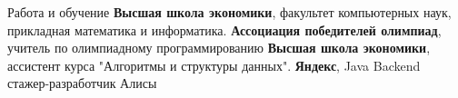 \begin{rubric}{Работа и обучение}
\entry*[\textbf{2019 -- 2023}]
	\textbf{Высшая школа экономики}, факультет компьютерных наук, прикладная математика и информатика.
\entry*[\textbf{2019 -- 2020}]
	\textbf{Ассоциация победителей олимпиад}, учитель по олимпиадному программированию
\entry*[\textbf{2020 -- 2021}]
    \textbf{Высшая школа экономики}, ассистент курса "Алгоритмы и структуры данных".
\entry*[\textbf{2020 -- н.в.}]
	\textbf{Яндекс}, Java Backend стажер-разработчик Алисы
\end{rubric}
